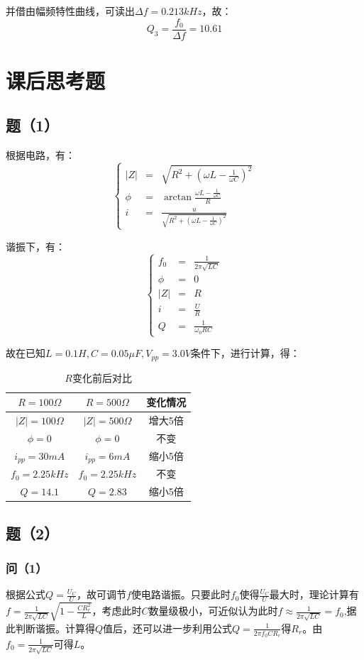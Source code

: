 \documentclass{ctexart}
\begin{document}
并借由幅频特性曲线，可读出$\Delta f=0.213 kHz$，故：$$Q_3=\frac{f_0}{\Delta f}=10.61$$

\section{课后思考题}
\subsection{题（1）}
根据电路，有：$$ \left\{
  \begin{aligned}
  |Z| & = & \sqrt{R^2+(\omega L-\frac{1}{\omega C})^2} \\
  \phi & = & \arctan{\frac{\omega L-\frac{1}{\omega C}}{R}} \\
  i & = & \frac {u}{\sqrt{R^2+(\omega L-\frac{1}{\omega C})^2}}
  \end{aligned}
  \right.
  $$

  谐振下，有：
$$ \left\{
\begin{aligned}
f_0 & = & \frac{1}{2\pi\sqrt{LC}} \\
\phi & = & 0 \\
|Z| & = & R \\
i & = & \frac {U}{R}\\
Q & = & \frac{1}{\omega_0RC}
\end{aligned}
\right.
$$

故在已知$L=0.1H,C=0.05\mu F,V_{pp}=3.0V$条件下，进行计算，得：
\begin{table}[H]
  \centering
  \caption{$R$变化前后对比}
    \begin{tabular}{c|c|c}
    $R=100\Omega$ & $R=500\Omega$ & 变化情况 \\\hline
    $|Z|=100\Omega$ & $|Z|=500\Omega$ & 增大5倍 \\
    $\phi=0$ & $\phi=0$ & 不变 \\
    $i_{pp}=30mA$ & $i_{pp}=6mA$ & 缩小5倍 \\
    $f_0=2.25kHz$ & $f_0=2.25kHz$ & 不变 \\
    $Q=14.1$ & $Q=2.83$ & 缩小5倍 \\
    \end{tabular}%
  \label{tab:addlabel}%
\end{table}%
\subsection{题（2）}
\subsubsection{问（1）}
根据公式$Q=\frac{U_C}{U}$，故可调节$f$使电路谐振。只要此时$f_0$使得$\frac{U_C}{U}$最大时，理论计算有$f=\frac{1}{2\pi\sqrt{LC}}\sqrt{1-\frac{CR_r^2}{L}}$，考虑此时$C$数量级极小，可近似认为此时$f\approx\frac{1}{2\pi\sqrt{LC}}=f_0$,据此判断谐振。计算得$Q$值后，还可以进一步利用公式$Q=\frac{1}{2\pi f_0CR_r}$得$R_r$。由$f_0=\frac{1}{2\pi\sqrt{LC}}$可得$L$。
\end{document}
